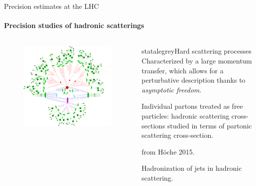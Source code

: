 
\begin{frame}{Precision estimates at the LHC}
  \framesubtitle{Precision studies of hadronic scatterings}

  \begin{columns}

    \begin{column}{0.5 \textwidth}

      \begin{figure}
        \centering
        \includegraphics[width = \textwidth]{../imgs/hadr-scatt.pdf}
      \end{figure}

    \end{column}

    \begin{column}{0.5 \textwidth}

      \begin{colorblock}[black]{statalegrey}{Hard scattering processes}
        \justifying
        Characterized by a large momentum transfer, which allows for a perturbative description thanks to \emph{asymptotic freedom}.

        Individual partons treated as free particles: hadronic scattering cross-sections studied in terms of partonic scattering cross-section.
      \end{colorblock}

      \vspace{0.5em}

       from Höche 2015.

      \justifying
      Hadronization of jets in hadronic scattering.

    \end{column}

  \end{columns}

\end{frame}

